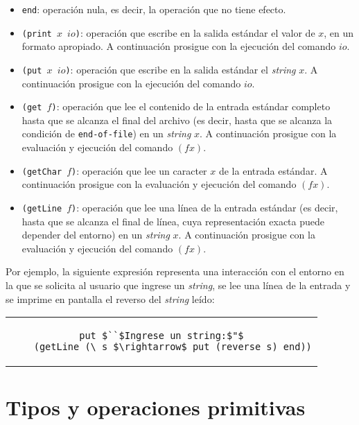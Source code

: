 \begin{itemize}
  \item \texttt{end}:
    operación nula, es decir, la operación que no tiene efecto.
  \item \texttt{(print $x$ $io$)}:
    operación que escribe en la salida estándar el valor de $x$,
    en un formato apropiado.
    A continuación prosigue con la ejecución del comando $io$.
  \item \texttt{(put $x$ $io$)}:
    operación que escribe en la salida estándar el {\em string} $x$.
    A continuación prosigue con la ejecución del comando $io$.
  \item \texttt{(get $f$)}:
    operación que lee el contenido de la entrada estándar completo
    hasta que se alcanza el final del archivo (es decir, hasta que se alcanza
    la condición de \texttt{end-of-file}) en un {\em string} $x$.
    A continuación prosigue con la evaluación y ejecución del comando $(f x)$.
  \item \texttt{(getChar $f$)}:
    operación que lee un caracter $x$ de la entrada estándar.
    A continuación prosigue con la evaluación y ejecución del comando $(f x)$.
  \item \texttt{(getLine $f$)}:
    operación que lee una línea de la entrada estándar
    (es decir, hasta que se alcanza el final de línea, cuya representación
    exacta puede depender del entorno) en un {\em string} $x$.
    A continuación prosigue con la evaluación y ejecución del comando $(f x)$.
\end{itemize}

Por ejemplo, la siguiente expresión representa una interacción con el entorno
en la que se solicita al usuario que ingrese un {\em string},
se lee una línea de la entrada
y se imprime en pantalla el reverso del {\em string} leído:

\begin{center}
\begin{tabular}{c}
\begin{lstlisting}[mathescape=true]
put $``$Ingrese un string:$"$
    (getLine (\ s $\rightarrow$ put (reverse s) end))
\end{lstlisting}
\end{tabular}
\end{center}

\section{Tipos y operaciones primitivas}

